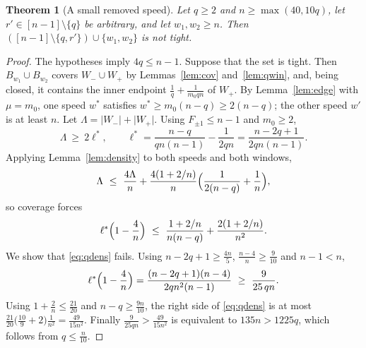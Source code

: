 \documentclass[11pt]{article}
\newtheorem{theorem}{Theorem}[section]
\theoremstyle{definition}
\begin{document}
\begin{theorem}[A small removed speed]\label{thm:qsmall}
Let $q\ge2$ and $n\ge\max(40,10q)$, let $r'\in[n-1]\setminus\{q\}$ be
arbitrary, and let $w_1,w_2\ge n$. Then
$([n-1]\setminus\{q,r'\})\cup\{w_1,w_2\}$ is not tight.
\end{theorem}

\begin{proof}
The hypotheses imply $4q\le n-1$. Suppose that the set is tight. Then
$B_{w_1}\cup B_{w_2}$ covers $W_-\cup W_+$ by Lemmas~\ref{lem:cov}
and~\ref{lem:qwin}, and, being closed, it contains the inner endpoint
$\frac1q+\frac1{m_0qn}$ of $W_+$. By Lemma~\ref{lem:edge} with
$\mu=m_0$, one speed $w^*$ satisfies $w^*\ge m_0(n-q)\ge2(n-q)$; the
other speed $w'$ is at least $n$. Let
$\Lambda=\lvert W_-\rvert+\lvert W_+\rvert$. Using $F_{\pm1}\le n-1$ and
$m_0\ge2$,
\[
\Lambda\ \ge\ 2\ell^*,\qquad
\ell^*=\frac{n-q}{qn(n-1)}-\frac1{2qn}=\frac{n-2q+1}{2qn(n-1)} .
\]
Applying Lemma~\ref{lem:density} to both speeds and both windows,
\[
\Lambda\ \le\ \frac{4\Lambda}n+\frac{4(1+2/n)}n
\Bigl(\frac1{2(n-q)}+\frac1n\Bigr),
\]
so coverage forces
\begin{equation}\label{eq:qdens}
\ell^*\Bigl(1-\frac4n\Bigr)\ \le\
\frac{1+2/n}{n(n-q)}+\frac{2(1+2/n)}{n^2}.
\end{equation}
We show that \eqref{eq:qdens} fails. Using $n-2q+1\ge\frac{4n}5$,
$\frac{n-4}n\ge\frac9{10}$ and $n-1<n$,
\[
\ell^*\Bigl(1-\frac4n\Bigr)=\frac{(n-2q+1)(n-4)}{2qn^2(n-1)}
\ \ge\ \frac9{25\,qn}.
\]
Using $1+\frac2n\le\frac{21}{20}$ and $n-q\ge\frac{9n}{10}$, the right
side of \eqref{eq:qdens} is at most
$\frac{21}{20}\bigl(\frac{10}9+2\bigr)\frac1{n^2}=\frac{49}{15n^2}$.
Finally $\frac9{25qn}>\frac{49}{15n^2}$ is equivalent to $135n>1225q$,
which follows from $q\le\frac n{10}$.
\end{proof}
\end{document}
